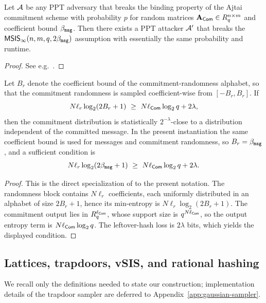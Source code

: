 \begin{lemma}\label{lem:ajtai-binding}
Let $\mathcal{A}$ be any PPT adversary that breaks the binding property of the Ajtai commitment scheme with probability $p$ for
random matrices $\mathbf{A}_{\mathsf{Com}}\in R_q^{n \times m}$ and coefficient bound $\beta_{\mathtt{msg}}$. Then there exists a PPT attacker
$\mathcal{A}'$ that breaks the $\mathsf{MSIS}_\infty(n,m,q,2\beta_{\mathtt{msg}})$ assumption with essentially the same probability and
runtime.
\end{lemma}

\begin{proof}
See e.g.~\cite[Lemma~2]{EPRINT:AttCraKoh21}.
\end{proof}

\begin{lemma}\label{lem:ajtai-hiding}
Let \(B_r\) denote the coefficient bound of the commitment-randomness alphabet, so that the commitment randomness is
sampled coefficient-wise from \([ -B_r,B_r]\). If
\[
N\ell_r \log_2(2B_r+1)\ \ge\ N\ell_{\ComScheme}\log_2 q + 2\lambda,
\]
then the commitment distribution is statistically \(2^{-\lambda}\)-close to a distribution independent of the committed
message. In the present instantiation the same coefficient bound is used for messages and commitment randomness, so
\(B_r=\beta_{\mathtt{msg}}\), and a sufficient condition is
\[
N\ell_r \log_2(2\BoundMsg+1)\ \ge\ N\ell_{\ComScheme}\log_2 q + 2\lambda.
\]
\end{lemma}

\begin{proof}
This is the direct specialization of \cite[Lemma~1]{EPRINT:AttCraKoh21} to the present notation. The randomness block
contains \(N\ell_r\) coefficients, each uniformly distributed in an alphabet of size \(2B_r+1\), hence its min-entropy
is \(N\ell_r \log_2(2B_r+1)\). The commitment output lies in \(R_q^{\ell_{\mathsf{Com}}}\), whose support size is
\(q^{N\ell_{\mathsf{Com}}}\), so the output entropy term is \(N\ell_{\mathsf{Com}}\log_2 q\). The leftover-hash loss is
\(2\lambda\) bits, which yields the displayed condition.
\end{proof}

\subsection{Lattices, trapdoors, vSIS, and rational hashing}
\label{subsec:prelim-vsis}
We recall only the definitions needed to state our construction; implementation details of the trapdoor sampler are
deferred to Appendix~\ref{app:gaussian-sampler}.

